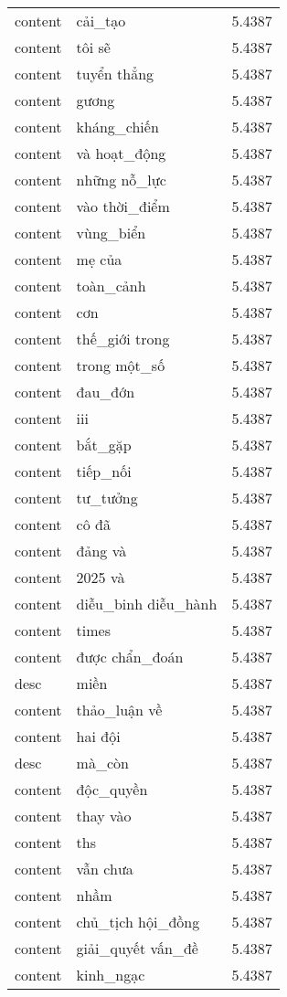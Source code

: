 \documentclass{article}
\begin{document}
\begin{tabular}{lll}
content & cải\_tạo & 5.4387\\
content & tôi sẽ & 5.4387\\
content & tuyển thẳng & 5.4387\\
content & gương & 5.4387\\
content & kháng\_chiến & 5.4387\\
content & và hoạt\_động & 5.4387\\
content & những nỗ\_lực & 5.4387\\
content & vào thời\_điểm & 5.4387\\
content & vùng\_biển & 5.4387\\
content & mẹ của & 5.4387\\
content & toàn\_cảnh & 5.4387\\
content & cơn & 5.4387\\
content & thế\_giới trong & 5.4387\\
content & trong một\_số & 5.4387\\
content & đau\_đớn & 5.4387\\
content & iii & 5.4387\\
content & bắt\_gặp & 5.4387\\
content & tiếp\_nối & 5.4387\\
content & tư\_tưởng & 5.4387\\
content & cô đã & 5.4387\\
content & đảng và & 5.4387\\
content & 2025 và & 5.4387\\
content & diễu\_binh diễu\_hành & 5.4387\\
content & times & 5.4387\\
content & được chẩn\_đoán & 5.4387\\
desc & miền & 5.4387\\
content & thảo\_luận về & 5.4387\\
content & hai đội & 5.4387\\
desc & mà\_còn & 5.4387\\
content & độc\_quyền & 5.4387\\
content & thay vào & 5.4387\\
content & ths & 5.4387\\
content & vẫn chưa & 5.4387\\
content & nhầm & 5.4387\\
content & chủ\_tịch hội\_đồng & 5.4387\\
content & giải\_quyết vấn\_đề & 5.4387\\
content & kinh\_ngạc & 5.4387\\

\end{tabular}
\end{document}
